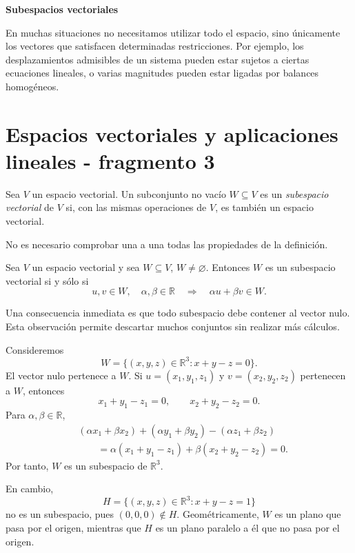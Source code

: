 \textbf{Subespacios vectoriales}

En muchas situaciones no necesitamos utilizar todo el espacio, sino únicamente los vectores que satisfacen determinadas restricciones. Por ejemplo, los desplazamientos admisibles de un sistema pueden estar sujetos a ciertas ecuaciones lineales, o varias magnitudes pueden estar ligadas por balances homogéneos.


\section{Espacios vectoriales y aplicaciones lineales - fragmento 3}
\begin{definition}
Sea $V$ un espacio vectorial. Un subconjunto no vacío $W\subseteq V$ es un \emph{subespacio vectorial} de $V$ si, con las mismas operaciones de $V$, es también un espacio vectorial.
\end{definition}

No es necesario comprobar una a una todas las propiedades de la definición.

\begin{theorem}
Sea $V$ un espacio vectorial y sea $W\subseteq V$, $W\neq\varnothing$. Entonces $W$ es un subespacio vectorial si y sólo si
\[
u,v\in W,\quad \alpha,\beta\in\mathbb{R}
\quad\Longrightarrow\quad
\alpha u+\beta v\in W.
\]
\end{theorem}

Una consecuencia inmediata es que todo subespacio debe contener al vector nulo. Esta observación permite descartar muchos conjuntos sin realizar más cálculos.

\begin{example}
Consideremos
\[
W=\{(x,y,z)\in\mathbb{R}^3:x+y-z=0\}.
\]
El vector nulo pertenece a $W$. Si $u=(x_1,y_1,z_1)$ y $v=(x_2,y_2,z_2)$ pertenecen a $W$, entonces
\[
x_1+y_1-z_1=0,
\qquad
x_2+y_2-z_2=0.
\]
Para $\alpha,\beta\in\mathbb{R}$,
\[
\begin{aligned}
&(\alpha x_1+\beta x_2)+(\alpha y_1+\beta y_2)
 -(\alpha z_1+\beta z_2)\\
&\qquad=\alpha(x_1+y_1-z_1)+\beta(x_2+y_2-z_2)=0.
\end{aligned}
\]
Por tanto, $W$ es un subespacio de $\mathbb{R}^3$.

En cambio,
\[
H=\{(x,y,z)\in\mathbb{R}^3:x+y-z=1\}
\]
no es un subespacio, pues $(0,0,0)\notin H$. Geométricamente, $W$ es un plano que pasa por el origen, mientras que $H$ es un plano paralelo a él que no pasa por el origen.
\end{example}


